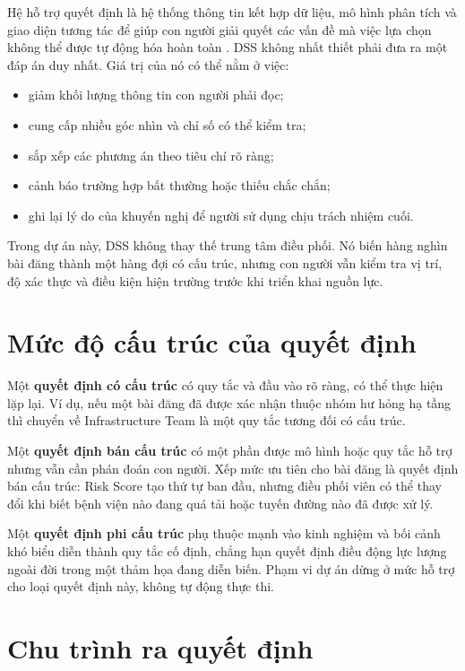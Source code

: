 Hệ hỗ trợ quyết định là hệ thống thông tin kết hợp dữ liệu, mô hình phân tích
và giao diện tương tác để giúp con người giải quyết các vấn đề mà việc lựa
chọn không thể được tự động hóa hoàn toàn \cite{power2002,slides}. DSS không
nhất thiết phải đưa ra một đáp án duy nhất. Giá trị của nó có thể nằm ở việc:

\begin{itemize}[leftmargin=*]
  \item giảm khối lượng thông tin con người phải đọc;
  \item cung cấp nhiều góc nhìn và chỉ số có thể kiểm tra;
  \item sắp xếp các phương án theo tiêu chí rõ ràng;
  \item cảnh báo trường hợp bất thường hoặc thiếu chắc chắn;
  \item ghi lại lý do của khuyến nghị để người sử dụng chịu trách nhiệm cuối.
\end{itemize}

Trong dự án này, DSS không thay thế trung tâm điều phối. Nó biến hàng nghìn
bài đăng thành một hàng đợi có cấu trúc, nhưng con người vẫn kiểm tra vị trí,
độ xác thực và điều kiện hiện trường trước khi triển khai nguồn lực.

\section{Mức độ cấu trúc của quyết định}

Một \textbf{quyết định có cấu trúc} có quy tắc và đầu vào rõ ràng, có thể thực
hiện lặp lại. Ví dụ, nếu một bài đăng đã được xác nhận thuộc nhóm hư hỏng hạ
tầng thì chuyển về Infrastructure Team là một quy tắc tương đối có cấu trúc.

Một \textbf{quyết định bán cấu trúc} có một phần được mô hình hoặc quy tắc hỗ
trợ nhưng vẫn cần phán đoán con người. Xếp mức ưu tiên cho bài đăng là quyết
định bán cấu trúc: Risk Score tạo thứ tự ban đầu, nhưng điều phối viên có thể
thay đổi khi biết bệnh viện nào đang quá tải hoặc tuyến đường nào đã được xử
lý.

Một \textbf{quyết định phi cấu trúc} phụ thuộc mạnh vào kinh nghiệm và bối
cảnh khó biểu diễn thành quy tắc cố định, chẳng hạn quyết định điều động lực
lượng ngoài đời trong một thảm họa đang diễn biến. Phạm vi dự án dừng ở mức
hỗ trợ cho loại quyết định này, không tự động thực thi.

\section{Chu trình ra quyết định}

